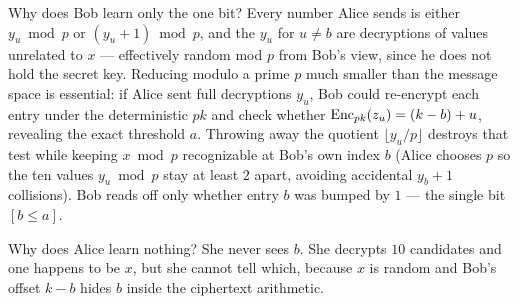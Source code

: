 \begin{walkbox}
Why does Bob learn only the one bit? Every number Alice sends is either $y_u \bmod p$ or $(y_u + 1) \bmod p$, and the $y_u$ for $u \ne b$ are decryptions of values unrelated to $x$ --- effectively random mod $p$ from Bob's view, since he does not hold the secret key. Reducing modulo a prime $p$ much smaller than the message space is essential: if Alice sent full decryptions $y_u$, Bob could re-encrypt each entry under the deterministic $pk$ and check whether $\operatorname{Enc}_{pk}(z_u) = (k - b) + u$, revealing the exact threshold $a$. Throwing away the quotient $\lfloor y_u / p \rfloor$ destroys that test while keeping $x \bmod p$ recognizable at Bob's own index $b$ (Alice chooses $p$ so the ten values $y_u \bmod p$ stay at least $2$ apart, avoiding accidental $y_b + 1$ collisions). Bob reads off only whether entry $b$ was bumped by $1$ --- the single bit $[b \le a]$.

Why does Alice learn nothing? She never sees $b$. She decrypts $10$ candidates and one happens to be $x$, but she cannot tell which, because $x$ is random and Bob's offset $k - b$ hides $b$ inside the ciphertext arithmetic.
\end{walkbox}

